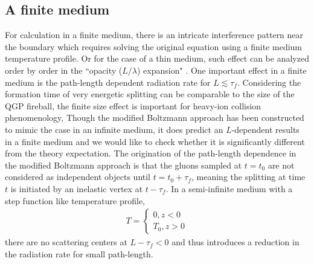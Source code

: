 \documentclass[aps, prc, reprint, amsmath, groupedaddress, nofootinbib]{revtex4-1}
\begin{document}
\subsection{A finite medium}
For calculation in a finite medium, there is an intricate interference pattern near the boundary which requires solving the original equation using a finite medium temperature profile. 
Or for the case of a thin medium, such effect can be analyzed order by order in the ``opacity ($L/\lambda$) expansion" \cite{Wiedemann:2000za,Gyulassy:1999zd}. 
One important effect in a finite medium is the path-length dependent radiation rate for $L \lesssim \tau_f$. Considering the formation time of very energetic splitting can be comparable to the size of the QGP fireball, the finite size effect is important for heavy-ion collision phenomenology,
Though the modified Boltzmann approach has been constructed to mimic the case in an infinite medium, it does predict an $L$-dependent results in a finite medium and we would like to check whether it is significantly different from the theory expectation.
The origination of the path-length dependence in the modified Boltzmann approach is that the gluons sampled at $t=t_0$ are not considered as independent objects until $t = t_0+\tau_f$, meaning the splitting at time $t$ is initiated by an inelastic vertex at $t-\tau_f$.
In a semi-infinite medium with a step function like temperature profile, 
\begin{eqnarray}
T = \begin{cases}
0 , z<0\\
T_0, z>0
\end{cases}
\end{eqnarray}
there are no scattering centers at $L-\tau_f<0$ and thus introduces a reduction in the radiation rate for small path-length.
\end{document}
